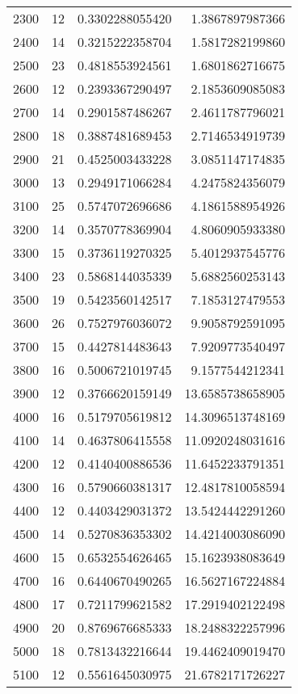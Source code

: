 \begin{longtable}{lrrr}
2300 & 12 & 0.3302288055420 & 1.3867897987366 \\
2400 & 14 & 0.3215222358704 & 1.5817282199860 \\
2500 & 23 & 0.4818553924561 & 1.6801862716675 \\
2600 & 12 & 0.2393367290497 & 2.1853609085083 \\
2700 & 14 & 0.2901587486267 & 2.4611787796021 \\
2800 & 18 & 0.3887481689453 & 2.7146534919739 \\
2900 & 21 & 0.4525003433228 & 3.0851147174835 \\
3000 & 13 & 0.2949171066284 & 4.2475824356079 \\
3100 & 25 & 0.5747072696686 & 4.1861588954926 \\
3200 & 14 & 0.3570778369904 & 4.8060905933380 \\
3300 & 15 & 0.3736119270325 & 5.4012937545776 \\
3400 & 23 & 0.5868144035339 & 5.6882560253143 \\
3500 & 19 & 0.5423560142517 & 7.1853127479553 \\
3600 & 26 & 0.7527976036072 & 9.9058792591095 \\
3700 & 15 & 0.4427814483643 & 7.9209773540497 \\
3800 & 16 & 0.5006721019745 & 9.1577544212341 \\
3900 & 12 & 0.3766620159149 & 13.6585738658905 \\
4000 & 16 & 0.5179705619812 & 14.3096513748169 \\
4100 & 14 & 0.4637806415558 & 11.0920248031616 \\
4200 & 12 & 0.4140400886536 & 11.6452233791351 \\
4300 & 16 & 0.5790660381317 & 12.4817810058594 \\
4400 & 12 & 0.4403429031372 & 13.5424442291260 \\
4500 & 14 & 0.5270836353302 & 14.4214003086090 \\
4600 & 15 & 0.6532554626465 & 15.1623938083649 \\
4700 & 16 & 0.6440670490265 & 16.5627167224884 \\
4800 & 17 & 0.7211799621582 & 17.2919402122498 \\
4900 & 20 & 0.8769676685333 & 18.2488322257996 \\
5000 & 18 & 0.7813432216644 & 19.4462409019470 \\
5100 & 12 & 0.5561645030975 & 21.6782171726227 \\
\end{longtable}
